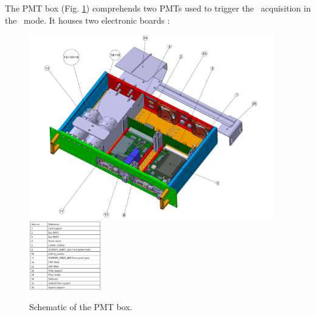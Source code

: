 The PMT box (Fig. \ref{fig:laspmtbox}) comprehends two PMTs \cite{ref:pmt} used to trigger the \laserii~acquisition in the \laser~mode. It houses two electronic boards :


\begin{figure}[htbp]
\centering
\includegraphics[height=8cm]{figures/pmtbox_meca.pdf}
\includegraphics[height=3cm]{figures/pmtbox_list.pdf}
\caption{Schematic of the PMT box.}\label{fig:laspmtbox}
\end{figure}

